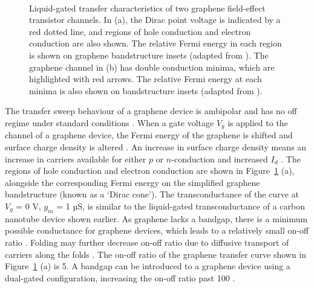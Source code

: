 \documentclass[
  a4paper,
]{scrbook}
\begin{document}
\begin{figure}
\begin{minipage}[t]{0.45\linewidth}
\end{minipage}%
%
\begin{minipage}[t]{0.01\linewidth}

{\centering 

~

}

\end{minipage}%

\caption{\label{fig-graphene-characteristics}Liquid-gated transfer
characteristics of two graphene field-effect transistor channels. In
(a), the Dirac point voltage is indicated by a red dotted line, and
regions of hole conduction and electron conduction are also shown. The
relative Fermi energy in each region is shown on graphene bandstructure
insets (adapted from \autocite{Geim2007,Ohno2015}). The graphene channel
in (b) has double conduction minima, which are highlighted with red
arrows. The relative Fermi energy at each minima is also shown on
bandstructure insets (adapted from \autocite{Peng2018}).}

\end{figure}

The transfer sweep behaviour of a graphene device is ambipolar and has
no off regime under standard conditions
\autocite{Novoselov2004,Bartolomeo2011,Ohno2015}. When a gate voltage
\(V_g\) is applied to the channel of a graphene device, the Fermi energy
of the graphene is shifted and surface charge density is altered
\autocite{Novoselov2004,Heller2010,Ohno2015}. An increase in surface
charge density means an increase in carriers available for either \(p\)
or \(n\)-conduction and increased \(I_d\) \autocite{Geim2007}. The
regions of hole conduction and electron conduction are shown in
Figure~\ref{fig-graphene-characteristics} (a), alongside the
corresponding Fermi energy on the simplified graphene bandstructure
(known as a `Dirac cone'). The transconductance of the curve at \(V_g\)
= 0 V, \(g_m\) = 1 µS, is similar to the liquid-gated transconductance
of a carbon nanotube device shown earlier. As graphene lacks a bandgap,
there is a minimum possible conductance for graphene devices, which
leads to a relatively small on-off ratio
\autocite{Novoselov2004,Geim2007}. Folding may further decrease on-off
ratio due to diffusive transport of carriers along the folds
\autocite{Zhu2012}. The on-off ratio of the graphene transfer curve
shown in Figure~\ref{fig-graphene-characteristics} (a) is 5. A bandgap
can be introduced to a graphene device using a dual-gated configuration,
increasing the on-off ratio past 100 \autocite{Xia2010}.
\end{document}
